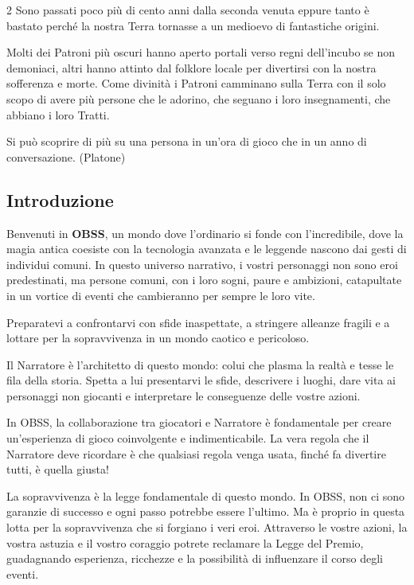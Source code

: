 \begin{multicols}{2}
Sono passati poco più di cento anni dalla seconda venuta eppure tanto è bastato perché la nostra Terra tornasse a un medioevo di fantastiche origini.

Molti dei Patroni più oscuri hanno aperto portali verso regni dell'incubo se non demoniaci, altri hanno attinto dal folklore locale per divertirsi con la nostra sofferenza e morte. Come divinità i Patroni camminano sulla Terra con il solo scopo di avere più persone che le adorino, che seguano i loro insegnamenti, che abbiano i loro Tratti.

\medskip

\begin{enfasi}{Si può scoprire di più su una persona in un'ora di gioco che in un anno di conversazione. (Platone)}\end{enfasi}

\subsection{Introduzione}

Benvenuti in \textbf{OBSS}, un mondo dove l'ordinario si fonde con l'incredibile, dove la magia antica coesiste con la tecnologia avanzata e le leggende nascono dai gesti di individui comuni. In questo universo narrativo, i vostri personaggi non sono eroi predestinati, ma persone comuni, con i loro sogni, paure e ambizioni, catapultate in un vortice di eventi che cambieranno per sempre le loro vite.

Preparatevi a confrontarvi con sfide inaspettate, a stringere alleanze fragili e a lottare per la sopravvivenza in un mondo caotico e pericoloso.

Il Narratore è l’architetto di questo mondo: colui che plasma la realtà e tesse le fila della storia.
Spetta a lui presentarvi le sfide, descrivere i luoghi, dare vita ai personaggi non giocanti e interpretare le conseguenze delle vostre azioni.

In OBSS, la collaborazione tra giocatori e Narratore è fondamentale per creare un’esperienza di gioco coinvolgente e indimenticabile.
La vera regola che il Narratore deve ricordare è che qualsiasi regola venga usata, finché fa divertire tutti, è quella giusta!

La sopravvivenza è la legge fondamentale di questo mondo. In OBSS, non ci sono garanzie di successo e ogni passo potrebbe essere l'ultimo. Ma è proprio in questa lotta per la sopravvivenza che si forgiano i veri eroi. Attraverso le vostre azioni, la vostra astuzia e il vostro coraggio potrete reclamare la Legge del Premio, guadagnando esperienza, ricchezze e la possibilità di influenzare il corso degli eventi.


\end{multicols}
